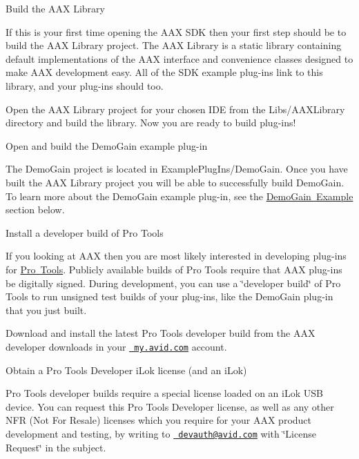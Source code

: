 
\begin{DoxyItemize}
\item  Build the A\+AX Library  

If this is your first time opening the A\+AX S\+DK then your first step should be to build the A\+AX Library project. The A\+AX Library is a static library containing default implementations of the A\+AX interface and convenience classes designed to make A\+AX development easy. All of the S\+DK example plug-\/ins link to this library, and your plug-\/ins should too. 



Open the A\+AX Library project for your chosen I\+DE from the Libs/\+A\+A\+X\+Library directory and build the library. Now you are ready to build plug-\/ins! 


\item  Open and build the Demo\+Gain example plug-\/in  

The Demo\+Gain project is located in Example\+Plug\+Ins/\+Demo\+Gain. Once you have built the A\+AX Library project you will be able to successfully build Demo\+Gain. To learn more about the Demo\+Gain example plug-\/in, see the \mbox{\hyperlink{a00794_aax_sdk_guide_02_demogain_example}{Demo\+Gain Example}} section below. 


\item  Install a developer build of Pro Tools  

If you looking at A\+AX then you are most likely interested in developing plug-\/ins for \mbox{\hyperlink{a00830}{Pro Tools}}. Publicly available builds of Pro Tools require that A\+AX plug-\/ins be digitally signed. During development, you can use a \char`\"{}developer build\char`\"{} of Pro Tools to run unsigned test builds of your plug-\/ins, like the Demo\+Gain plug-\/in that you just built. 



Download and install the latest Pro Tools developer build from the A\+AX developer downloads in your \href{https://my.avid.com/account}{\texttt{ my.\+avid.\+com}} account. 


\item  Obtain a Pro Tools Developer i\+Lok license (and an i\+Lok)  

Pro Tools developer builds require a special license loaded on an i\+Lok U\+SB device. You can request this Pro Tools Developer license, as well as any other N\+FR (Not For Resale) licenses which you require for your A\+AX product development and testing, by writing to \href{mailto:devauth@avid.com?subject=License Request}{\texttt{ devauth@avid.\+com}} with \char`\"{}\+License Request\char`\"{} in the subject. 




\end{DoxyItemize}
